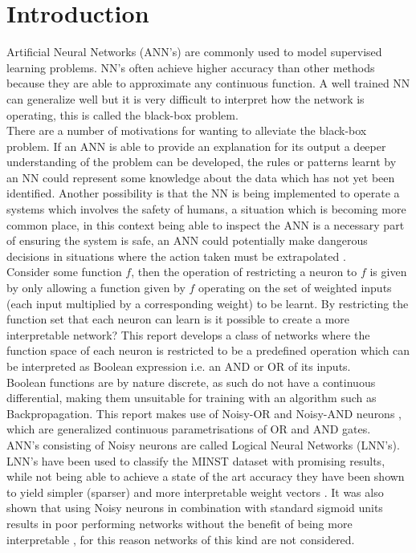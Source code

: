 \chapter{Introduction}\label{C:intro}
Artificial Neural Networks (ANN's) are commonly used to model supervised learning problems. NN's often achieve higher accuracy than other methods because they are able to approximate any continuous function. A well trained NN can generalize well but it is very difficult to interpret how the network is operating, this is called the black-box problem. \\

There are a number of motivations for wanting to alleviate the black-box problem. If an ANN is able to provide an explanation for its output a deeper understanding of the problem can be developed, the rules or patterns learnt by an NN could represent some knowledge about the data which has not yet been identified. Another possibility is that the NN is being implemented to operate a systems which involves the safety of humans, a situation which is becoming more common place, in this context being able to inspect the ANN is a necessary part of ensuring the system is safe, an ANN could potentially make dangerous decisions in situations where the action taken must be extrapolated \cite{andrews1995survey}.\\

Consider some function $f$, then the operation of restricting a neuron to $f$ is given by only allowing a function given by $f$ operating on the set of weighted inputs (each input multiplied by a corresponding weight) to be learnt. By restricting the function set that each neuron can learn is it possible to create a more interpretable network? This report develops a class of networks where the function space of each neuron is restricted to be a predefined operation which can be interpreted as Boolean expression i.e. an AND or OR of its inputs.\\

Boolean functions are by nature discrete, as such do not have a continuous differential, making them unsuitable for training with an algorithm such as Backpropagation. This report makes use of Noisy-OR and Noisy-AND neurons \cite{LearningLogicalActivations}, which are generalized continuous parametrisations of OR and AND gates.\\

ANN's consisting of Noisy neurons are called Logical Neural Networks (LNN's). LNN's have been used to classify the MINST dataset with promising results, while not being able to achieve a state of the art accuracy they have been shown to yield simpler (sparser) and more interpretable weight vectors \cite{LearningLogicalActivations}. It was also shown that using Noisy neurons in combination with standard sigmoid units results in poor performing networks without the benefit of being more interpretable \cite{LearningLogicalActivations}, for this reason networks of this kind are not considered.\\

